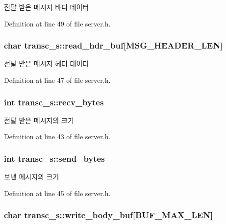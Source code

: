 전달 받은 메시지 바디 데이터 



Definition at line 49 of file server.\-h.

\hypertarget{structtransc__s_adca0080bd3aef13f613a1a6e22ea39f2}{
\subsubsection[{read\-\_\-hdr\-\_\-buf}]{\setlength{\rightskip}{0pt plus 5cm}char transc\-\_\-s\-::read\-\_\-hdr\-\_\-buf\mbox{[}{\bf M\-S\-G\-\_\-\-H\-E\-A\-D\-E\-R\-\_\-\-L\-E\-N}\mbox{]}}}\label{structtransc__s_adca0080bd3aef13f613a1a6e22ea39f2}


전달 받은 메시지 헤더 데이터 



Definition at line 47 of file server.\-h.

\hypertarget{structtransc__s_aef73ff34bbe9058828cde7c551549fb0}{
\subsubsection[{recv\-\_\-bytes}]{\setlength{\rightskip}{0pt plus 5cm}int transc\-\_\-s\-::recv\-\_\-bytes}}\label{structtransc__s_aef73ff34bbe9058828cde7c551549fb0}


전달 받은 메시지의 크기 



Definition at line 43 of file server.\-h.

\hypertarget{structtransc__s_a45be42e8e0a387c3cbda8b56cf6b57c7}{
\subsubsection[{send\-\_\-bytes}]{\setlength{\rightskip}{0pt plus 5cm}int transc\-\_\-s\-::send\-\_\-bytes}}\label{structtransc__s_a45be42e8e0a387c3cbda8b56cf6b57c7}


보낸 메시지의 크기 



Definition at line 45 of file server.\-h.

\hypertarget{structtransc__s_a2dc989617bf243d4314c43439046fb0a}{
\subsubsection[{write\-\_\-body\-\_\-buf}]{\setlength{\rightskip}{0pt plus 5cm}char transc\-\_\-s\-::write\-\_\-body\-\_\-buf\mbox{[}{\bf B\-U\-F\-\_\-\-M\-A\-X\-\_\-\-L\-E\-N}\mbox{]}}}\label{structtransc__s_a2dc989617bf243d4314c43439046fb0a}


